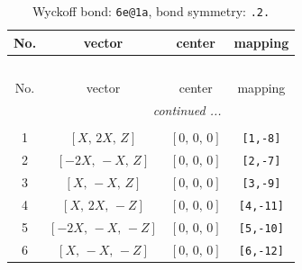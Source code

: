 \documentclass[fleqn,8pt]{jsarticle}
\begin{document}
\renewcommand{\arraystretch}{1.2}
\begin{longtable}{cccc}
\caption{Wyckoff bond: {\tt 6e@1a}, bond symmetry: {\tt .2.}}
 \\
 \hline \hline
No. & vector & center & mapping \\ \hline \endfirsthead

\multicolumn{3}{l}{\tablename\ \thetable{}} \\
 \hline \hline
No. & vector & center & mapping \\ \hline \endhead

 \hline \hline
\multicolumn{3}{r}{\footnotesize\it continued ...} \\ \endfoot

 \hline \hline
\multicolumn{3}{r}{} \\ \endlastfoot

1 & $\left[ X,\, 2 X,\, Z \right]$ & $\left[ 0,\, 0,\, 0 \right]$ & {\tt [1,-8]} \\ \hline
2 & $\left[ - 2 X,\, - X,\, Z \right]$ & $\left[ 0,\, 0,\, 0 \right]$ & {\tt [2,-7]} \\ \hline
3 & $\left[ X,\, - X,\, Z \right]$ & $\left[ 0,\, 0,\, 0 \right]$ & {\tt [3,-9]} \\ \hline
4 & $\left[ X,\, 2 X,\, - Z \right]$ & $\left[ 0,\, 0,\, 0 \right]$ & {\tt [4,-11]} \\ \hline
5 & $\left[ - 2 X,\, - X,\, - Z \right]$ & $\left[ 0,\, 0,\, 0 \right]$ & {\tt [5,-10]} \\ \hline
6 & $\left[ X,\, - X,\, - Z \right]$ & $\left[ 0,\, 0,\, 0 \right]$ & {\tt [6,-12]} \\
\end{longtable}
\renewcommand{\arraystretch}{1.2}
\end{document}
